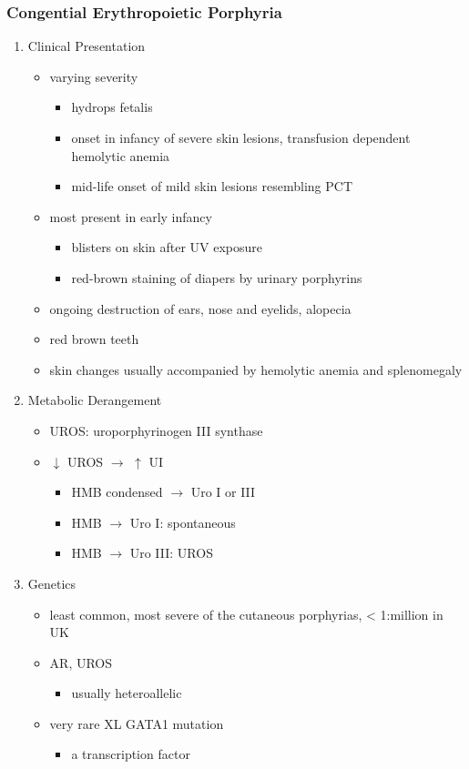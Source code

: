 \documentclass{scrartcl}
\begin{document}
\subsubsection{Congential Erythropoietic Porphyria}
\label{sec:org7262af5}
\begin{enumerate}
\item Clinical Presentation
\label{sec:org2c2ba89}
\begin{itemize}
\item varying severity
\begin{itemize}
\item hydrops fetalis
\item onset in infancy of severe skin lesions, transfusion dependent
hemolytic anemia
\item mid-life onset of mild skin lesions resembling PCT
\end{itemize}
\item most present in early infancy
\begin{itemize}
\item blisters on skin after UV exposure
\item red-brown staining of diapers by urinary porphyrins
\end{itemize}
\item ongoing destruction of ears, nose and eyelids, alopecia
\item red brown teeth
\item skin changes usually accompanied by hemolytic anemia and splenomegaly
\end{itemize}
\item Metabolic Derangement
\label{sec:org5c5e251}
\begin{itemize}
\item UROS: uroporphyrinogen III synthase
\item \(\downarrow\) UROS \(\to\) \(\uparrow\) UI
\begin{itemize}
\item HMB condensed \(\to\) Uro I or III
\item HMB \(\rightarrow\) Uro I: spontaneous
\item HMB \(\rightarrow\) Uro III: UROS
\end{itemize}
\end{itemize}
\item Genetics
\label{sec:orgf5aed85}
\begin{itemize}
\item least common, most severe of the cutaneous porphyrias, < 1:million in UK
\item AR, UROS
\begin{itemize}
\item usually heteroallelic
\end{itemize}
\item very rare XL GATA1 mutation
\begin{itemize}
\item a transcription factor
\end{itemize}
\end{itemize}


\end{enumerate}
\end{document}
